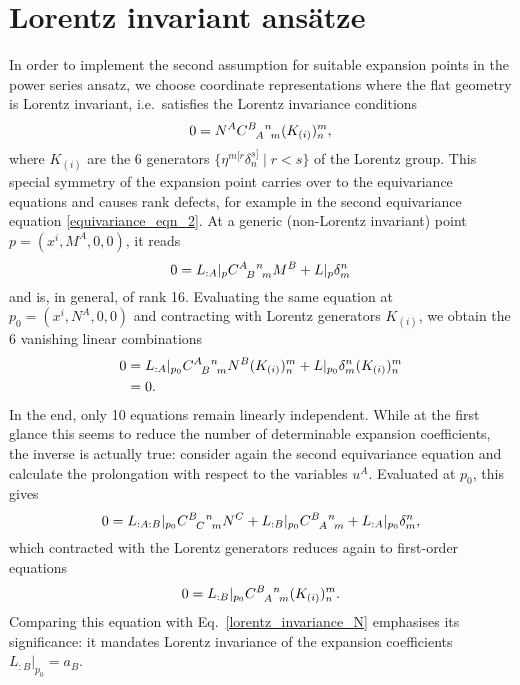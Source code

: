 \section{Lorentz invariant ansätze}

In order to implement the second assumption for suitable expansion points in the power series ansatz, we choose coordinate representations where the flat geometry is Lorentz invariant, i.e.\ satisfies the Lorentz invariance conditions
\begin{equation}\label{lorentz_invariance_N}
  0 = N^A \gmc{B}{A}{n}{m} (K_{(i)})^m_n,
\end{equation}
where $K_{(i)}$ are the 6 generators $\{ \eta^{m\lbrack r}\delta^{s\rbrack}_n \mid r < s \}$ of the Lorentz group. This special symmetry of the expansion point carries over to the equivariance equations and causes rank defects, for example in the second equivariance equation \eqref{equivariance_eqn_2}. At a generic (non-Lorentz invariant) point $p=(x^i,M^A,0,0)$, it reads
\begin{equation}
  0 = L_{:A}\rvert_p \gmc{A}{B}{n}{m} M^B + L\rvert_p \delta^n_m
\end{equation}
and is, in general, of rank 16. Evaluating the same equation at $p_0 = (x^i,N^A,0,0)$ and contracting with Lorentz generators $K_{(i)}$, we obtain the 6 vanishing linear combinations
\begin{equation}
  \begin{aligned}
    0 &{} = L_{:A}\rvert_{p_0} \gmc{A}{B}{n}{m} N^B (K_{(i)})^m_n + L\rvert_{p_0} \delta^n_m (K_{(i)})^m_n \\
      &{} = 0.
  \end{aligned}
\end{equation}
In the end, only 10 equations remain linearly independent. While at the first glance this seems to reduce the number of determinable expansion coefficients, the inverse is actually true: consider again the second equivariance equation and calculate the prolongation with respect to the variables $u^A$. Evaluated at $p_0$, this gives
\begin{equation}
  0 = L_{:A:B}\rvert_{p_0} \gmc{B}{C}{n}{m} N^C + L_{:B}\rvert_{p_0} \gmc{B}{A}{n}{m} + L_{:A}\rvert_{p_0} \delta^n_m,
\end{equation}
which contracted with the Lorentz generators reduces again to first-order equations
\begin{equation}\label{ansatz_equation}
  0 = L_{:B}\rvert_{p_0}\gmc{B}{A}{n}{m}(K_{(i)})^m_n.
\end{equation}
Comparing this equation with Eq.~\ref{lorentz_invariance_N} emphasises its significance: it mandates Lorentz invariance of the expansion coefficients $L_{:B}\rvert_{p_0} = a_B$.

